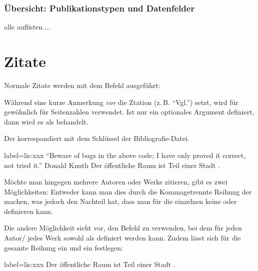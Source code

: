 \subsubsection{Übersicht: Publikationstypen und Datenfelder}

alle auflisten....


\section{Zitate}

Normale Zitate werden mit dem Befehl  ausgeführt:

Während   eine kurze Anmerkung \emph{vor} die Ztation (z.\,B. \enquote{Vgl.}) setzt, 
wird   für gewöhnlich für Seitenzahlen verwendet.
Ist nur ein optionales Argument definiert, 
dann wird es als  behandelt.
Der  korrespondiert mit dem Schlüssel der Bibliografie-Datei.

\begin{lfgwexample}{label={lis:xxx}}
\enquote{Beware of bugs in the above code; I have only proved it correct, not tried it.} Donald Knuth
Der öffentliche Raum ist Teil einer Stadt \cite{Osland2016}.
\end{lfgwexample}

Möchte man hingegen mehrere Autoren oder Werke zitieren, 
gibt es zwei Möglichkeiten:
Entweder kann man dies durch die Kommagetrennte Reihung der  machen,
was jedoch den Nachteil hat, dass man für die einzelnen  keine  oder  definieren kann.

Die andere Möglichkeit sieht vor, den Befehl  zu verwenden, 
bei dem für jeden Autor/ jedes Werk sowohl  als  definiert werden kann.
Zudem lässt sich für die gesamte Reihung ein  und ein  festlegen:
\begin{lfgwexample}{label={lis:xxx}}
Der öffentliche Raum ist Teil einer Stadt \cites(vgl.)(){Osland2016}{Evangelidis2014}.
\end{lfgwexample}
 
